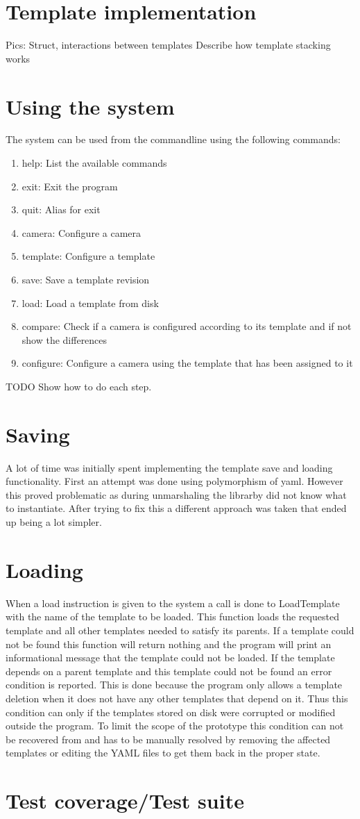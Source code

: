 \section{Template implementation}
Pics:
Struct, interactions between templates
Describe how template stacking works

\section{Using the system}
The system can be used from the commandline using the following commands:
\begin{enumerate}
\item help: List the available commands
\item exit: Exit the program
\item quit: Alias for exit
\item camera: Configure a camera
\item template: Configure a template
\item save: Save a template revision
\item load: Load a template from disk
\item compare: Check if a camera is configured according to its template and if not show the differences
\item configure: Configure a camera using the template that has been assigned to it
\end{enumerate}

TODO Show how to do each step.

\section{Saving}
A lot of time was initially spent implementing the template save and loading functionality.
First an attempt was done using polymorphism of yaml. However this proved problematic as during unmarshaling the librarby did not know what to instantiate.
After trying to fix this a different approach was taken that ended up being a lot simpler.

\section{Loading}
When a load instruction is given to the system a call is done to LoadTemplate with the name of the template to be loaded.
This function loads the requested template and all other templates needed to satisfy its parents.
If a template could not be found this function will return nothing and the program will print an informational message that the template could not be loaded.
If the template depends on a parent template and this template could not be found an error condition is reported.
This is done because the program only allows a template deletion when it does not have any other templates that depend on it.
Thus this condition can only if the templates stored on disk were corrupted or modified outside the program.
To limit the scope of the prototype this condition can not be recovered from and has to be manually resolved by removing the affected templates or editing the YAML files to get them back in the proper state.

\section{Test coverage/Test suite}

